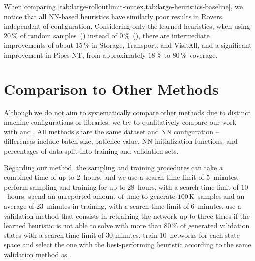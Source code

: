 When comparing \cref{tab:large-rolloutlimit-mutex,tab:large-heuristics-baseline}, we notice that all NN-based heuristics have similarly poor results in Rovers, independent of configuration. Considering only the learned heuristics, when using $20\,\%$ of random samples~(\hnnrs) instead of $0\,\%$~(\hnnl{\rlmeanfx}), there are intermediate improvements of about $15\,\%$ in Storage, Transport, and VisitAll, and a significant improvement in Pipes-NT, from approximately $18\,\%$ to $80\,\%$~coverage.

\section{Comparison to Other Methods}
\label{sec:large-exps-comparison}

Although we do not aim to systematically compare other methods due to distinct machine configurations or libraries, we try to qualitatively compare our work with \citet{ferber2022neural} and \citet{otoole2022sampling}. All methods share the same dataset and NN configuration -- differences include batch size, patience value, NN initialization functions, and percentages of data split into training and validation sets.

Regarding our method, the sampling and training procedures can take a combined time of up to $2$~hours, and we use a search time limit of $5$~minutes. \citet{ferber2022neural} perform sampling and training for up to $28$~hours, with a search time limit of $10$~hours. \citet{otoole2022sampling} spend an unreported amount of time to generate $100$\,K~samples and an average of $23$~minutes in training, with a search time-limit of $6$~minutes. \citet{ferber2022neural} use a validation method that consists in retraining the network up to three times if the learned heuristic is not able to solve with \gbfs more than $80\,\%$ of generated validation states with a search time-limit of $30$ minutes. \citet{otoole2022sampling} train $10$~networks for each state space and select the one with the best-performing heuristic according to the same validation method as \citet{ferber2022neural}.


